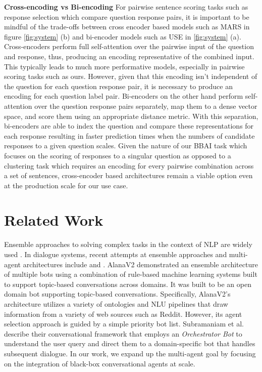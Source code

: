 \documentclass[11pt]{article}
\begin{document}
\textbf{Cross-encoding vs Bi-encoding}
For pairwise sentence scoring tasks such as response selection which compare question response pairs, it is important to be mindful of the trade-offs between cross encoder based models such as MARS in figure \ref{fig:system} (b) and bi-encoder models such as USE in \ref{fig:system} (a). Cross-encoders perform full self-attention over the pairwise input of the question and response, thus, producing an encoding representative of the combined input. This typically leads to much more performative models, especially in pairwise scoring tasks such as ours. However, given that this encoding isn't independent of the question for each question response pair, it is necessary to produce an encoding for each question label pair. Bi-encoders on the other hand perform self-attention over the question response pairs separately, map them to a dense vector space, and score them using an appropriate distance metric. With this separation, bi-encoders are able to index the question and compare these representations for each response resulting in faster prediction times when the numbers of candidate responses to a given question scales. Given the nature of our BBAI task which focuses on the scoring of responses to a singular question as opposed to a clustering task which requires an encoding for every pairwise combination across a set of sentences, cross-encoder based architectures remain a viable option even at the production scale for our use case.


\section{Related Work}

Ensemble approaches to solving complex tasks in the context of NLP are widely used \cite{deng2014ensemble, ARAQUE2017236}.
In dialogue systems, recent attempts at ensemble approaches and multi-agent architectures include \citet{alanav2} and \citet{Subramaniam:2018:CCM:3237383.3237472}.
AlanaV2 \cite{alanav2} demonstrated an ensemble architecture of multiple bots using a combination of rule-based machine learning systems built to support topic-based conversations across domains. It was built to be an open domain bot supporting topic-based conversations. Specifically, AlanaV2's architecture utilizes a variety of ontologies and NLU pipelines that draw information from a variety of web sources such as Reddit. However, its agent selection approach is guided by a simple priority bot list.
Subramaniam et al.~\cite{Subramaniam:2018:CCM:3237383.3237472} describe their conversational framework that employs an \textit{Orchestrator Bot} to understand the user query and direct them to a domain-specific bot that handles subsequent dialogue. In our work, we expand up the multi-agent goal by focusing on the integration of black-box conversational agents at scale.
\end{document}
